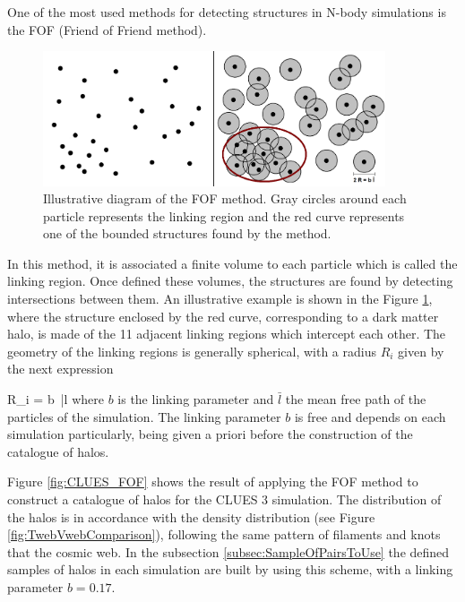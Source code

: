 	
One of the most used methods for detecting structures in N-body simulations
is the FOF (Friend of Friend method).


\newpage
\begin{figure}[htbp]
	\centering
	\includegraphics[width=0.9\textwidth]
	{./figures/3_nbody_simulations/FOF_Method.png}

	\caption{\small{Illustrative diagram of the FOF method. Gray circles 
	around each particle represents the linking region and the red curve
	represents one of the bounded structures found by the method.}}
	
	\label{fig:FOF_Method}
\end{figure}


In this method, it is associated a finite volume to each particle which
is called the linking region. Once defined these volumes, the structures
are found by detecting intersections between them. An illustrative example
is shown in the Figure \ref{fig:FOF_Method}, where the structure enclosed 
by the red curve, corresponding to a dark matter halo, is made of the 11
adjacent linking regions which intercept each other. The geometry of the
linking regions is generally spherical, with a radius $R_i$ given by the
next expression


{ R_i = b\ \bar l }
where $b$ is the linking parameter and $\bar l$ the mean free path of the 
particles of the simulation. The linking parameter $b$ is free and depends
on each simulation particularly, being given a priori before the 
construction of the catalogue of halos.



Figure \ref{fig:CLUES_FOF} shows the result of applying the FOF method to
construct a catalogue of halos for the CLUES 3 simulation. The distribution
of the halos is in accordance with the density distribution (see Figure 
\ref{fig:TwebVwebComparison}), following the same pattern of filaments and
knots that the cosmic web. In the subsection \ref{subsec:SampleOfPairsToUse}
the defined samples of halos in each simulation are built by using this 
scheme, with a linking parameter $b = 0.17$.


